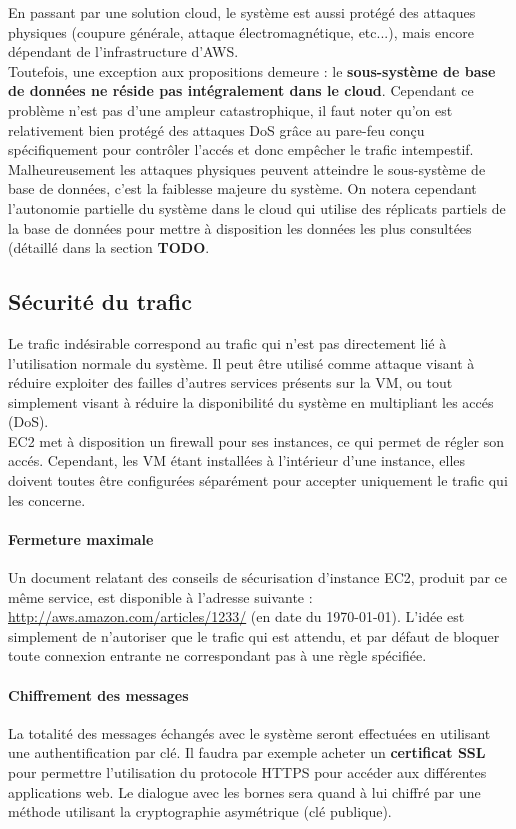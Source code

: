 En passant par une solution cloud, le système est aussi protégé des attaques
physiques (coupure générale, attaque électromagnétique, etc...), mais encore
dépendant de l'infrastructure d'AWS. \\

Toutefois, une exception aux propositions demeure : le \textbf{sous-système de
    base de données ne réside pas intégralement dans le cloud}. Cependant ce
problème n'est pas d'une ampleur catastrophique, il faut noter qu'on est
relativement bien protégé des attaques DoS grâce au pare-feu conçu
spécifiquement pour contrôler l'accés et donc empêcher le trafic intempestif.
Malheureusement les attaques physiques peuvent atteindre le sous-système de
base de données, c'est la faiblesse majeure du système. On notera cependant
l'autonomie partielle du système dans le cloud qui utilise des réplicats
partiels de la base de données pour mettre à disposition les données les plus
consultées (détaillé dans la section {\huge \textbf{TODO}}.

\subsection{Sécurité du trafic}
\label{subsec:securite-trafic}

Le trafic indésirable correspond au trafic qui n'est pas directement lié à
l'utilisation normale du système. Il peut être utilisé comme attaque visant à
réduire exploiter des failles d'autres services présents sur la VM, ou tout
simplement visant à réduire la disponibilité du système en multipliant les
accés (DoS). \\

EC2 met à disposition un firewall pour ses instances, ce qui permet de régler
son accés. Cependant, les VM étant installées à l'intérieur d'une instance,
elles doivent toutes être configurées séparément pour accepter uniquement le
trafic qui les concerne.

\paragraph{Fermeture maximale}

Un document relatant des conseils de sécurisation d'instance EC2, produit par
ce même service, est disponible à l'adresse suivante :
\url{http://aws.amazon.com/articles/1233/} (en date du \today). L'idée est
simplement de n'autoriser que le trafic qui est attendu, et par défaut de
bloquer toute connexion entrante ne correspondant pas à une règle spécifiée.

\paragraph{Chiffrement des messages}

La totalité des messages échangés avec le système seront effectuées en
utilisant une authentification par clé. Il faudra par exemple acheter un
\textbf{certificat SSL} pour permettre l'utilisation du protocole HTTPS pour
accéder aux différentes applications web. Le dialogue avec les bornes sera
quand à lui chiffré par une méthode utilisant la cryptographie asymétrique (clé
publique).


